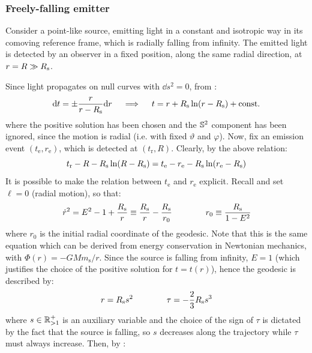 \subsubsection{Freely-falling emitter}

Consider a point-like source, emitting light in a constant and isotropic way in its comoving reference frame, which is radially falling from infinity. The emitted light is detected by an observer in a fixed position, along the same radial direction, at $ r = R \gg R_\text{s} $.

Since light propagates on null curves with $ \dd s^2 = 0 $, from :
\begin{equation*}
  \mathrm{d} t = \pm \frac{r}{r - R_\text{s}} \mathrm{d} r
  \quad \implies \quad
  t = r + R_\text{s} \ln (r - R_\text{s}) + \text{const.}
\end{equation*}
where the positive solution has been chosen and the $ \mathbb{S}^{2} $ component has been ignored, since the motion is radial (i.e. with fixed $ \vartheta $ and $ \varphi $).
Now, fix an emission event $ (t_\text{e} , r_\text{e}) $, which is detected at $ (t_\text{r},R) $. Clearly, by the above relation:
\begin{equation}
  t_\text{r} - R - R_\text{s} \ln (R - R_\text{s}) = t_\text{e} - r_\text{e} - R_\text{s} \ln (r_\text{e} - R_\text{s})
  \label{eq:aux-1}
\end{equation}
It is possible to make the relation between $ t_\text{e} $ and $ r_\text{e} $ explicit. Recall  and set $ \ell = 0 $ (radial motion), so that:
\begin{equation*}
  \dot{r}^2 = E^2 - 1 + \frac{R_\text{s}}{r} \equiv \frac{R_\text{s}}{r} - \frac{R_\text{s}}{r_0}
  \qquad \qquad
  r_0 \equiv \frac{R_\text{s}}{1 - E^2}
\end{equation*}
where $ r_0 $ is the initial radial coordinate of the geodesic. Note that this is the same equation which can be derived from energy conservation in Newtonian mechanics, with $ \Phi(r) = - GM m_\text{s} / r $. Since the source is falling from infinity, $ E = 1 $ (which justifies the choice of the positive solution for $ t = t(r) $), hence the geodesic is described by:
\begin{equation}
  r = R_\text{s} s^2
  \qquad \qquad
  \tau = - \frac{2}{3} R_\text{s} s^3
  \label{eq:aux-2}
\end{equation}
where $ s \in \mathbb{R}^+_{>1} $ is an auxiliary variable and the choice of the sign of $ \tau $ is dictated by the fact that the source is falling, so $ s $ decreases along the trajectory while $ \tau $ must always increase. Then, by :
